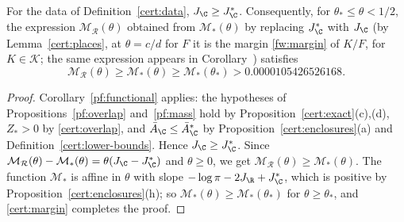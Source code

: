 \begin{lemma}\label{cert:lower-margin}
For the data of Definition~\ref{cert:data}, $J_\C\ge J_\C^*$.
Consequently, for $\theta_*\le\theta<1/2$, the expression
$\mathcal M_{\mathcal R}(\theta)$ obtained from $\mathcal M_*(\theta)$ by
replacing $J_\C^*$ with $J_\C$ (by Lemma~\ref{cert:places}, at $\theta=c/d$
for $F$ it is the margin \eqref{fw:margin} of $K/F$, for $K\in\mathcal K$;
the same expression appears in Corollary~) satisfies
\[
 \mathcal M_{\mathcal R}(\theta)\ge\mathcal M_*(\theta)\ge\mathcal
 M_*(\theta_*)>0.0000105426526168 .
\]
\end{lemma}

\begin{proof}
Corollary~\ref{pf:functional} applies: the hypotheses of
Propositions~\ref{pf:overlap} and~\ref{pf:mass} hold by
Proposition~\ref{cert:exact}(c),(d), $Z_*>0$ by \eqref{cert:overlap},
and $\bar A_\C\le\bar A_\C^*$ by Proposition~\ref{cert:enclosures}(a) and
Definition~\ref{cert:lower-bounds}. Hence $J_\C\ge J_\C^*$. Since
$\mathcal M_{\mathcal R}(\theta)-\mathcal M_*(\theta)=\theta(J_\C-J_\C^*)$
and $\theta\ge0$, we get $\mathcal M_{\mathcal R}(\theta)\ge\mathcal
M_*(\theta)$. The function $\mathcal M_*$ is affine in $\theta$ with slope
$-\log\pi-2J_\R+J_\C^*$, which is positive by
Proposition~\ref{cert:enclosures}(h); so $\mathcal M_*(\theta)\ge\mathcal
M_*(\theta_*)$ for $\theta\ge\theta_*$, and \eqref{cert:margin} completes the
proof.
\end{proof}

